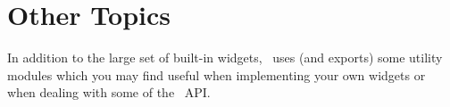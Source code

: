 \chapter{Other Topics}
\label{chap:other}

In addition to the large set of built-in widgets, \vtyui\ uses (and
exports) some utility modules which you may find useful when
implementing your own widgets or when dealing with some of the
\vtyui\ API.



